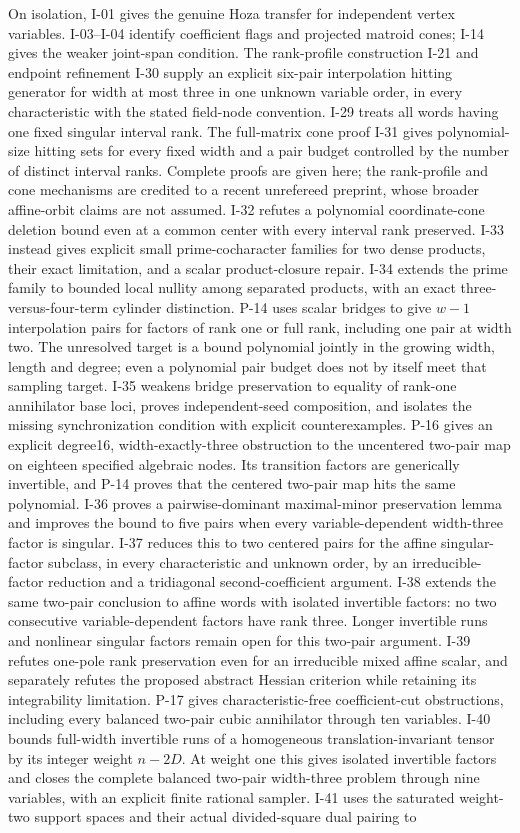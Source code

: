 On isolation, I-01 gives the genuine Hoza transfer for independent vertex variables. I-03--I-04 identify coefficient flags and projected matroid cones; I-14 gives the weaker joint-span condition. The rank-profile construction I-21 and endpoint refinement I-30 supply an explicit six-pair interpolation hitting generator for width at most three in one unknown variable order, in every characteristic with the stated field-node convention. I-29 treats all words having one fixed singular interval rank. The full-matrix cone proof I-31 gives polynomial-size hitting sets for every fixed width and a pair budget controlled by the number of distinct interval ranks. Complete proofs are given here; the rank-profile and cone mechanisms are credited to a recent unrefereed preprint, whose broader affine-orbit claims are not assumed. I-32 refutes a polynomial coordinate-cone deletion bound even at a common center with every interval rank preserved. I-33 instead gives explicit small prime-cocharacter families for two dense products, their exact limitation, and a scalar product-closure repair. I-34 extends the prime family to bounded local nullity among separated products, with an exact three-versus-four-term cylinder distinction. P-14 uses scalar bridges to give $w-1$ interpolation pairs for factors of rank one or full rank, including one pair at width two. The unresolved target is a bound polynomial jointly in the growing width, length and degree; even a polynomial pair budget does not by itself meet that sampling target. I-35 weakens bridge preservation to equality of rank-one annihilator base loci, proves independent-seed composition, and isolates the missing synchronization condition with explicit counterexamples. P-16 gives an explicit degree16, width-exactly-three obstruction to the uncentered two-pair map on eighteen specified algebraic nodes. Its transition factors are generically invertible, and P-14 proves that the centered two-pair map hits the same polynomial. I-36 proves a pairwise-dominant maximal-minor preservation lemma and improves the bound to five pairs when every variable-dependent width-three factor is singular. I-37 reduces this to two centered pairs for the affine singular-factor subclass, in every characteristic and unknown order, by an irreducible-factor reduction and a tridiagonal second-coefficient argument. I-38 extends the same two-pair conclusion to affine words with isolated invertible factors: no two consecutive variable-dependent factors have rank three. Longer invertible runs and nonlinear singular factors remain open for this two-pair argument. I-39 refutes one-pole rank preservation even for an irreducible mixed affine scalar, and separately refutes the proposed abstract Hessian criterion while retaining its integrability limitation. P-17 gives characteristic-free coefficient-cut obstructions, including every balanced two-pair cubic annihilator through ten variables. I-40 bounds full-width invertible runs of a homogeneous translation-invariant tensor by its integer weight $n-2D$. At weight one this gives isolated invertible factors and closes the complete balanced two-pair width-three problem through nine variables, with an explicit finite rational sampler. I-41 uses the saturated weight-two support spaces and their actual divided-square dual pairing to 